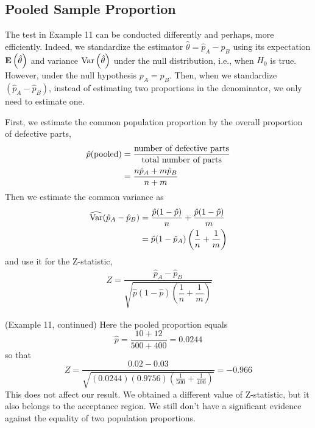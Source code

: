 \subsection{Pooled Sample Proportion}
\label{subsec:pooled-sample-proportion}

The test in Example 11 can be conducted differently and perhaps, more efficiently. Indeed, we standardize the estimator $\hat{\theta} = \hat{p}_A - \hat{p}_B$ using its expectation $\mathbf{E}\left(\hat{\theta}\right)$ and variance $\text{Var}\left( \hat{\theta} \right)$ under the null distribution, i.e., when $H_0$ is true. However, under the null hypothesis $p_A = p_B$. Then, when we standardize $(\hat{p}_A - \hat{p}_B)$, instead of estimating two proportions in the denominator, we only need to estimate one.

First, we estimate the common population proportion by the overall proportion of defective parts,
\begin{align*}
  \hat{p}(\textnormal{pooled}) &= \frac{\textnormal{number of defective parts}}{\textnormal{total number of parts}} \\
  &= \frac{n\hat{p}_A + m\hat{p}_B}{n + m}
\end{align*}
Then we estimate the common variance as
\begin{align*}
  \widehat{\textnormal{Var}}(\hat{p}_A - \hat{p}_B) &= \frac{\hat{p} (1 - \hat{p})}{n} + \frac{\hat{p} (1 - \hat{p})}{m} \\
  &= \hat{p}(1 - \hat{p}_A) \left( \frac{1}{n} + \frac{1}{m} \right)
\end{align*}
and use it for the Z-statistic,
\begin{align*}\
  Z = \dfrac{\hat{p}_A - \hat{p}_B}{\sqrt{\hat{p} (1 - \hat{p}) \left( \dfrac{1}{n} + \dfrac{1}{m} \right)}}
\end{align*}

\begin{example}{ (Example 11, continued)}
  Here the pooled proportion equals
  \begin{equation*}
    \hat{p} = \frac{10 + 12}{500 + 400} = 0.0244
  \end{equation*}
  so that
  \begin{equation*}
    Z = \frac{0.02 - 0.03}{\sqrt{(0.0244)(0.9756) \left( \frac{1}{500} + \frac{1}{400} \right)}} = -0.966
  \end{equation*}
  This does not affect our result. We obtained a different value of Z-statistic, but it also belongs to the acceptance region. We still don't have a significant evidence against the equality of two population proportions.
\end{example}
  